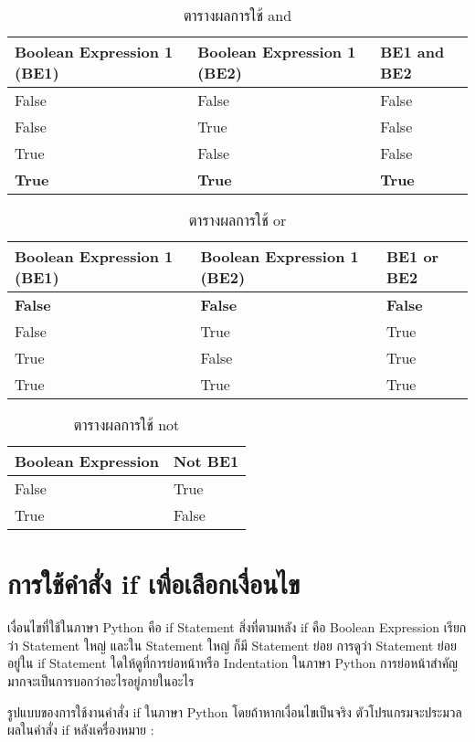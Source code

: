 \begin{table}
\caption{ตารางผลการใช้ and}
\centering
\begin{tabu}{l l l}
 \hline
Boolean Expression 1 (BE1) & Boolean Expression 1 (BE2) & BE1 and BE2  \\ [0.5ex] 
 \hline
False & False & False \\
False & True & False  \\
True & False & False \\
\textbf{True} & \textbf{True} & \textbf{True} \\
\end{tabu}
\end{table}

\begin{table}
\caption{ตารางผลการใช้ or}
\centering
\begin{tabu}{l l l}
 \hline
Boolean Expression 1 (BE1) & Boolean Expression 1 (BE2) & BE1 or BE2  \\ [0.5ex] 
 \hline
\textbf{False} & \textbf{False} & \textbf{False} \\
False & True & True  \\
True & False & True \\
True & True & True \\
\end{tabu}
\end{table}

\begin{table}
\caption{ตารางผลการใช้ not}
\centering
\begin{tabu}{l l}
 \hline
 Boolean Expression & Not BE1  \\ [0.5ex] 
 \hline
False	& True \\
True	& False \\
\end{tabu}
\end{table}

\section{การใช้คำสั่ง if เพื่อเลือกเงื่อนไข}

เงื่อนไขที่ใช้ในภาษา Python คือ if Statement สิ่งที่ตามหลัง if คือ Boolean Expression เรียกว่า Statement ใหญ่ และใน Statement ใหญ่ ก็มี Statement ย่อย การดูว่า Statement ย่อยอยู่ใน if Statement ใดให้ดูที่การย่อหน้าหรือ Indentation ในภาษา Python การย่อหน้าสำคัญมากจะเป็นการบอกว่าอะไรอยู่ภายในอะไร 

รูปแบบของการใช้งานคำสั่ง if ในภาษา Python โดยถ้าหากเงื่อนไขเป็นจริง ตัวโปรแกรมจะประมวลผลในคำสั่ง if หลังเครื่องหมาย : 

